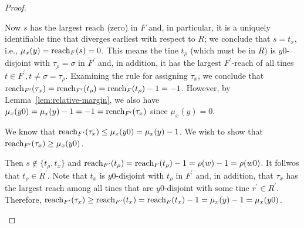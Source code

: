 \begin{proof}
\begin{description}[font=\normalfont\itshape\space]
\begin{description}[font=\normalfont\itshape\space]
					\item[If $d \leq |x|$.]
						Now $s$ has the largest reach (zero) in $F$ and, 
						in particular, it is a uniquely identifiable tine that diverges earliest 
						with respect to $R$; 
						we conclude that $s = t_x$, i.e., $\mu_x(y) = \operatorname{reach}_F(s) = 0$. 					
						This means the tine $t_\rho$ (which must be in $R$) 
						is $y0$-disjoint with $\tau_\rho = \sigma$ in $F^\prime$ 
						and, in addition, it has the largest $F^\prime$-reach of all tines $t \in F^\prime, t \neq \sigma = \tau_\rho$. 
						Examining the rule for assigning $\tau_x$, we conclude that 
						$\operatorname{reach}_{F^\prime}(\tau_x) = \operatorname{reach}_{F^\prime}(t_\rho) = \operatorname{reach}_F(t_\rho) - 1 = -1$. 
						However, by Lemma~\ref{lem:relative-margin}, we also have 
						$\mu_x(y0) = \mu_x(y) - 1 = -1 = \operatorname{reach}_{F^\prime}(\tau_x)$ 
						since $\mu_x(y) = 0$.

				\end{description}

			\item[If $\rho(w) > 0$ and $\mu_x(y) \neq 0$.]
				We know that $\operatorname{reach}_{F^\prime}(\tau_x) \leq \mu_x(y0) = \mu_x(y) - 1$. 
				We wish to show that $\operatorname{reach}_{F^\prime}(\tau_x) \geq \mu_x(y0)$. 

				\begin{description}[font=\normalfont\itshape\space]
					\item[If $\reach_F(s) = 0$.]
						Then $s \not \in \{t_\rho, t_x\}$  
						and 
						$\operatorname{reach}_{F^\prime}(t_\rho) = \operatorname{reach}_F(t_\rho) - 1 = \rho(w) - 1 = \rho(w0)$. 
						It follwos that $t_\rho \in R^\prime$. 
						Note that $t_x$ is $y0$-disjoint with $t_\rho$ in $F^\prime$ and, in addition, that 
						$\tau_x$ has the largest reach among all tines 
						that are $y0$-disjoint with some tine $r^\prime \in R^\prime$. 
						Therefore, 
						$\operatorname{reach}_{F^\prime}(\tau_x) \geq \operatorname{reach}_{F^\prime}(t_x) = \operatorname{reach}_{F}(t_x) - 1 = \mu_x(y) - 1 = \mu_x(y0)$. 

					\item[If $\reach_F(s) \neq 0$.]	


\end{description}
\end{description}
\end{proof}

